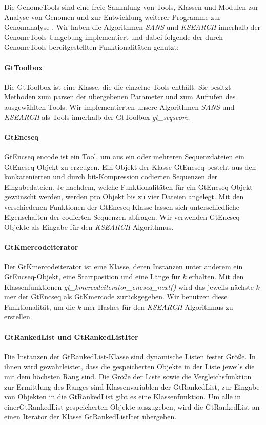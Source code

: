 \documentclass{article}
\begin{document}
Die GenomeTools sind eine freie Sammlung von Tools, Klassen und Modulen zur
Analyse von Genomen und zur Entwicklung weiterer Programme zur Genomanalyse \cite{gtools}. 
Wir haben die Algorithmen \emph{SANS} und \emph{KSEARCH} innerhalb der GenomeTools-Umgebung implementiert und dabei folgende der durch GenomeTools bereitgestellten Funktionalitäten genutzt:

\paragraph{GtToolbox}
Die GtToolbox ist eine Klasse, die die einzelne Tools enthält. Sie besitzt
Methoden zum parsen der übergebenen Parameter und zum Aufrufen des ausgewählten
Tools. Wir implementierten unsere Algorithmen \emph{SANS} und \emph{KSEARCH} als Tools
innerhalb der GtToolbox \emph{gt\_seqscore}. 

\paragraph{GtEncseq}
GtEncseq encode ist ein Tool, um aus ein oder mehreren Sequenzdateien ein
GtEncseq-Objekt zu erzeugen. Ein Objekt der Klasse GtEncseq besteht aus den
konkatenierten und durch bit-Kompression codierten Sequenzen der Eingabedateien.
Je nachdem, welche Funktionalitäten für ein GtEncseq-Objekt gewünscht werden, werden pro Objekt bis zu vier Dateien angelegt. Mit den verschiedenen Funktionen der GtEncseq-Klasse lassen sich unterschiedliche Eigenschaften der codierten Sequenzen abfragen. Wir verwenden GtEncseq-Objekte als Eingabe für den \emph{KSEARCH}-Algorithmus.

\paragraph{GtKmercodeiterator}
Der GtKmercodeiterator ist eine Klasse, deren Instanzen unter anderem ein GtEncseq-Objekt, eine Startposition und eine Länge für $k$ erhalten. Mit den Klassenfunktionen \emph{gt\_kmercodeiterator\_encseq\_next()} wird das jeweils nächste $k$-mer der GtEncseq als GtKmercode zurückgegeben. Wir benutzen diese Funktionalität, um die $k$-mer-Hashes für den \emph{KSEARCH}-Algorithmus zu erstellen.

\paragraph{GtRankedList und GtRankedListIter}
Die Instanzen der GtRankedList-Klasse sind dynamische Listen fester Größe. In ihnen wird gewährleistet, dass die gespeicherten Objekte in der Liste jeweils die mit dem höchsten Rang sind. 
Die Größe der Liste sowie die Vergleichsfunktion zur Ermittlung des Ranges sind Klassenvariablen der GtRankedList, zur Eingabe von Objekten in die GtRankedList gibt es eine Klassenfunktion. 
Um alle in einerGtRankedList gespeicherten Objekte auszugeben, wird die GtRankedList an einen Iterator der Klasse GtRankedListIter übergeben.
\end{document}
